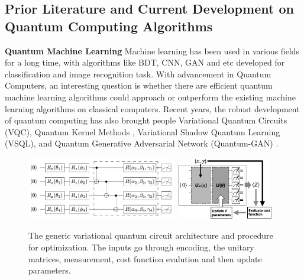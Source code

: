 \documentclass{article}
\begin{document}
\subsection{Prior Literature and Current Development on Quantum Computing Algorithms}

\textbf{Quantum Machine Learning} Machine learning has been used in various fields for a long time, 
with algorithms like BDT, CNN, GAN and etc developed for classification and image recognition task. 
With advancement in Quantum Computers, an interesting question is whether there are efficient 
quantum machine learning algorithms could approach or outperform the 
existing machine learning algorithms on classical computers. 
Recent years, the robust development of quantum computing has also brought people 
Variational Quantum Circuits (VQC), Quantum Kernel Methods \cite{qml_kernel} \cite{qml_kernel2}, 
Variational Shadow Quantum Learning (VSQL)\cite{qml_vsql}, and Quantum Generative 
Adversarial Network (Quantum-GAN) \cite{qc_qgan}. 

\begin{figure}[h]
  \begin{center}
    \includegraphics[width=0.58\textwidth]{vqc.png} 
    \includegraphics[width=0.38\textwidth]{vqc1.png} 
  \end{center}
  \caption{The generic variational quantum circuit 
  architecture and procedure for optimization. The 
  inputs go through encoding, the unitary matrices, 
  measurement, cost function evalution and then 
  update parameters. 
  }
  \label{vqcc}
\end{figure}
\end{document}
